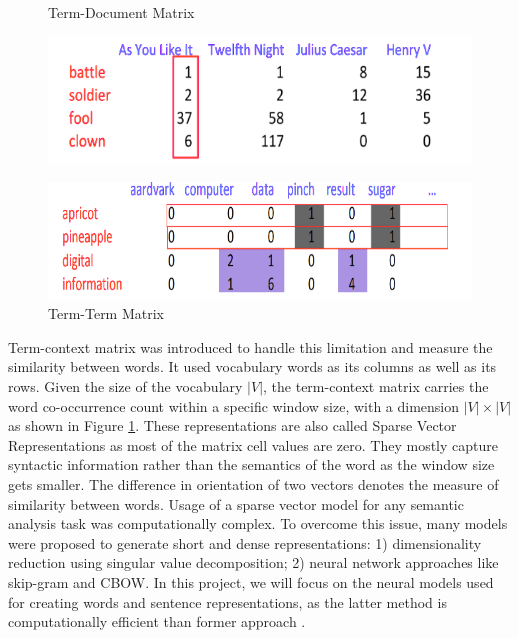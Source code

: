 \documentclass[12pt]{report} %
\begin{document}
\begin{figure}[!tbp]
	\centering
	\begin{minipage}[b]{0.4\textwidth}
		\centering
		\caption{ Term-Document Matrix}
		\label{doc-word}
		\includegraphics[scale=0.30]{image/doc-word.png}
	\end{minipage}
	\begin{minipage}[b]{0.4\textwidth}
		\centering
		\caption{Term-Term Matrix}
		\label{word-word}
		\includegraphics[scale=0.30]{image/word-word.png}    
	\end{minipage}
\end{figure}

Term-context matrix was introduced to handle this limitation and measure the similarity between words.  It used vocabulary words as its columns as well as its rows. Given the size of the vocabulary $|V|$, the term-context matrix carries the word co-occurrence count within a specific window size,  with a dimension $|V| \times |V|$ as shown in Figure \ref{word-word}. These representations are also called Sparse Vector Representations as most of the matrix cell values are zero. They mostly capture syntactic information rather than the semantics of the word as the window size gets smaller. The difference in orientation of two vectors denotes the measure of similarity between words. Usage of a sparse vector model for any semantic analysis task was computationally complex. To overcome this issue, many models were proposed to generate short and dense representations: 1) dimensionality reduction using singular value decomposition; 2) neural network approaches like skip-gram and CBOW. In this project, we will focus on the neural models used for creating words and sentence representations, as the latter method is computationally efficient than former approach \citep{jurafsky2014speech}.
\end{document}
